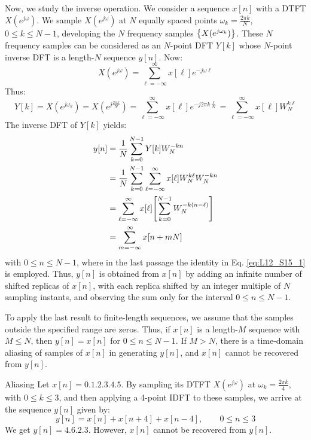 \documentclass[../../main/main.tex]{subfiles}
\begin{document}
\medskip
{}
Now, we study the inverse operation. We consider a sequence \( x[n] \) with a DTFT \( X(e^{j\omega}) \). We sample \( X(e^{j\omega}) \) at \( N \) equally spaced points \( \omega_{k} = \frac{2\pi k}{N} \), \( 0 \le k \le N-1 \), developing the \( N \) frequency samples \( \qty{X(e^{j\omega_{k}})} \).
These \( N \) frequency samples can be considered as an \( N \)-point DFT \( Y[k] \) whose \( N \)-point inverse DFT is a length-\( N \) sequence \( y[n] \). Now:
\begin{equation}
    X(e^{j\omega})
    =
    \sum_{\ell=-\infty}^{\infty} x[\ell] e^{-j\omega \ell}
    \label{eq:L12_S26_1}
\end{equation}
Thus:
\begin{equation}
    Y[k]
    =
    X(e^{j\omega_{k}})
    =
    X(e^{j\frac{2\pi k}{N}})
    =
    \sum_{\ell=-\infty}^{\infty} x[\ell] e^{-j 2\pi k \frac{\ell}{N}}
    =
    \sum_{\ell=-\infty}^{\infty} x[\ell] W_{N}^{k\ell}
    \label{eq:L12_S26_2}
\end{equation}
The inverse DFT of \( Y[k] \) yields:
\begin{align}
    y[n]
    &=
        \frac{1}{N} \sum_{k=0}^{N-1} Y[k] W_{N}^{-kn}   \nonumber   \\
    &=
        \frac{1}{N} \sum_{k=0}^{N-1} \sum_{\ell=-\infty}^{\infty} x[\ell] W_{N}^{k\ell} W_{N}^{-kn} \nonumber   \\
    &=
        \sum_{\ell=-\infty}^{\infty} x[\ell] \qty[\sum_{k=0}^{N-1} W_{N}^{-k(n-\ell)}]  \nonumber   \\
    &=
        \sum_{m=-\infty}^{\infty} x[n+mN]
\end{align}
with \( 0 \le n \le N-1 \), where in the last passage the identity in Eq. \ref{eq:L12_S15_1} is employed. Thus, \( y[n] \) is obtained from \( x[n] \) by adding an infinite number of shifted replicas of \( x[n] \), with each replica shifted by an integer multiple of \( N \) sampling instants, and observing the sum only for the interval \( 0 \le n \le N-1 \).

To apply the last result to finite-length sequences, we assume that the samples outside the specified range are zeros. Thus, if \( x[n] \) is a length-\( M \) sequence with \( M \le N \), then \( y[n] = x[n] \) for \( 0 \le n \le N-1 \).
If \( M > N \), there is a time-domain aliasing of samples of \( x[n] \) in generating \( y[n] \), and \( x[n] \) cannot be recovered from \( y[n] \).

\begin{example}{Aliasing}{}
    Let \( x[n] = \qty{0,1,2,3,4,5} \).
    By sampling its DTFT \( X(e^{j\omega}) \) at \( \omega_{k} = \frac{2\pi k}{4} \), with \( 0 \le k \le 3 \), and then applying a 4-point IDFT to these samples, we arrive at the sequence \( y[n] \) given by:
    \begin{equation}
        y[n]
        =
        x[n] + x[n+4] + x[n-4],
        \qquad
        0 \le n \le 3
        \label{eq:L12_S30_2}
    \end{equation}
    We get \( y[n] = \qty{4,6,2,3} \). However, \( x[n] \) cannot be recovered from \( y[n] \).
\end{example}
\end{document}
